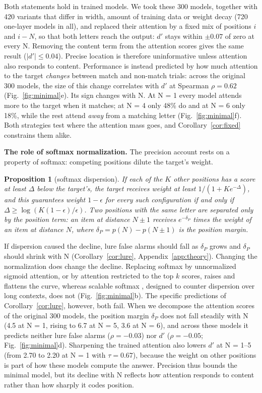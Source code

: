 \documentclass{article}
\newtheorem{proposition}{Proposition}
\newcommand{\dprime}{$d'$}
\begin{document}
Both statements hold in trained models. We took these 300 models, together with 420 variants that differ in width, amount of training data or weight decay (720 one-layer models in all), and replaced their attention by a fixed mix of positions $i$ and $i-N$, so that both letters reach the output: \dprime{} stays within $\pm0.07$ of zero at every N. Removing the content term from the attention scores gives the same result ($|d'|\le0.04$). Precise location is therefore uninformative unless attention also responds to content. Performance is instead predicted by how much attention to the target \emph{changes} between match and non-match trials: across the original 300 models, the size of this change correlates with \dprime{} at Spearman $\rho=0.62$ (Fig.~\ref{fig:minimal}e). Its sign changes with N. At N = 1 every model attends more to the target when it matches; at N = 4 only 48\% do and at N = 6 only 18\%, while the rest attend \emph{away} from a matching letter (Fig.~\ref{fig:minimal}f). Both strategies test where the attention mass goes, and Corollary~\ref{cor:fixed} constrains them alike.

\textbf{The role of softmax normalization.} The precision account rests on a property of softmax: competing positions dilute the target's weight.

\begin{proposition}[softmax dispersion]\label{prop:dispersion}
If each of the $K$ other positions has a score at least $\Delta$ below the target's, the target receives weight at least $1/(1+Ke^{-\Delta})$, and this guarantees weight $1-\epsilon$ for every such configuration if and only if $\Delta\ge\log(K(1-\epsilon)/\epsilon)$. Two positions with the same letter are separated only by the position term: an item at distance $N\pm1$ receives $e^{-\delta_P}$ times the weight of an item at distance $N$, where $\delta_P=p(N)-p(N\pm1)$ is the \emph{position margin}.
\end{proposition}
If dispersion caused the decline, lure false alarms should fall as $\delta_P$ grows and $\delta_P$ should shrink with N (Corollary~\ref{cor:lure}, Appendix~\ref{app:theory}). Changing the normalization does change the decline. Replacing softmax by unnormalized sigmoid attention, or by attention restricted to the top $k$ scores, raises and flattens the curve, whereas scalable softmax \citep{nakanishi2025scalable}, designed to counter dispersion over long contexts, does not (Fig.~\ref{fig:minimal}b). The specific predictions of Corollary~\ref{cor:lure}, however, both fail. When we decompose the attention scores of the original 300 models, the position margin $\delta_P$ does not fall steadily with N (4.5 at N = 1, rising to 6.7 at N = 5, 3.6 at N = 6), and across these models it predicts neither lure false alarms ($\rho=-0.03$) nor \dprime{} ($\rho=-0.05$; Fig.~\ref{fig:minimal}d). Sharpening the trained attention also lowers \dprime{} at N = 1--5 (from 2.70 to 2.20 at N = 1 with $\tau=0.67$), because the weight on other positions is part of how these models compute the answer. Precision thus bounds the minimal model, but its decline with N reflects how attention responds to content rather than how sharply it codes position.
\end{document}
